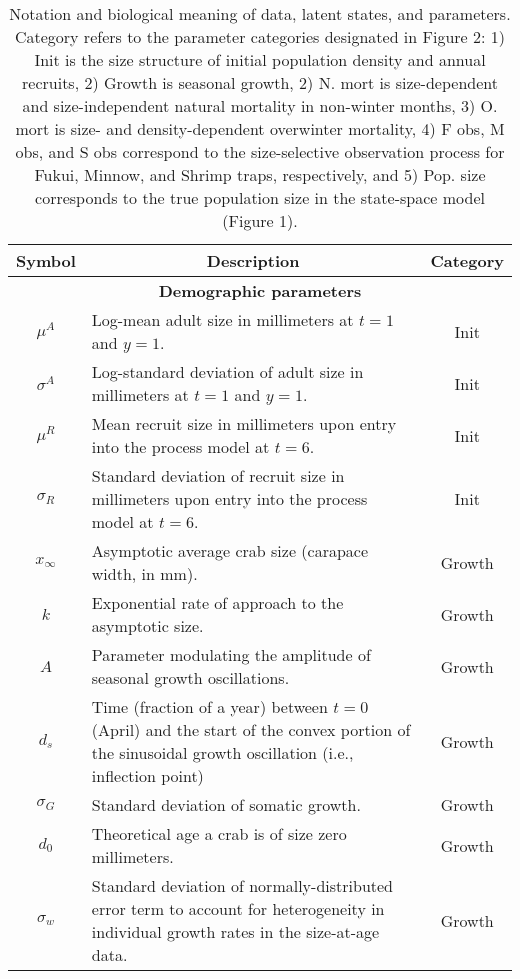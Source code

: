 \documentclass{article}
\begin{document}
\begin{table}[ht]
\caption{Notation and biological meaning of data, latent states, and parameters. Category refers to the parameter categories designated in Figure 2: 1) Init is the size structure of initial population density and annual recruits, 2) Growth is seasonal growth, 2) N. mort is size-dependent and size-independent natural mortality in non-winter months, 3) O. mort is size- and density-dependent overwinter mortality, 4) F obs, M obs, and S obs correspond to the size-selective observation process for Fukui, Minnow, and Shrimp traps, respectively, and 5) Pop. size corresponds to the true population size in the state-space model (Figure 1).}
\begin{tabular}{||c p{9cm} c||} 
 \hline
 \multicolumn{1}{||c|}{Symbol}  & \multicolumn{1}{c|}{Description} & \multicolumn{1}{c||}{Category} \\ [0.5ex] 
 \hline\hline
 \multicolumn{3}{||c||}{\textbf{Demographic parameters}} \\ 
 \hline
 $\mu^A$ & Log-mean adult size in millimeters at $t=1$ and $y=1$. & Init \\ 
 \hline
 $\sigma^A$ & Log-standard deviation of adult size in millimeters at $t=1$ and $y=1$. & Init \\ 
 \hline
 $\mu^R$ & Mean recruit size in millimeters upon entry into the process model at $t=6$. & Init \\ 
 \hline
 $\sigma_R$ & Standard deviation of recruit size in millimeters upon entry into the process model at $t=6$. & Init \\ 
 \hline
 $x_{\infty}$ & Asymptotic average crab size (carapace width, in mm). & Growth \\ 
 \hline
 $k$ & Exponential rate of approach to the asymptotic size. & Growth \\ 
 \hline
 $A$ & Parameter modulating the amplitude of seasonal growth oscillations. & Growth \\ 
 \hline
 $d_s$ & Time (fraction of a year) between $t = 0$ (April) and the start of the convex portion of the sinusoidal growth oscillation (i.e., inflection point) & Growth \\ 
 \hline
 $\sigma_G$ & Standard deviation of somatic growth. & Growth \\ 
 \hline
 $d_0$ & Theoretical age a crab is of size zero millimeters. & Growth \\ 
 \hline
 $\sigma_w$ & Standard deviation of normally-distributed error term to account for heterogeneity in individual growth rates in the size-at-age data. & Growth \\ 

\end{tabular}
\end{table}
\end{document}
